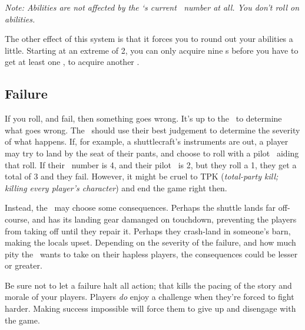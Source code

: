 \par\textit{Note: Abilities are not affected by the \pc `s current \both\, number at all. You don't roll on abilities.}

\par
The other effect of this system is that it forces you to round out your abilities a little. Starting at an extreme of 2, you can only acquire nine \lasersxp s before you have to get at least one \feelingsxp, to acquire another \lasersxp .

\subsection{Failure}
If you roll, and fail, then something goes wrong. It's up to the \gm\, to determine what goes wrong. The \gm\, should use their best judgement to determine the severity of what happens. If, for example, a shuttlecraft's instruments are out, a player may try to land by the seat of their pants, and choose to roll with a pilot \skill\, aiding that roll. If their \both\, number is 4, and their pilot \skill\, is 2, but they roll a 1, they get a total of 3 and they fail. However, it might be cruel to TPK (\textit{total-party kill; killing every player's character}) and end the game right then.

\par
Instead, the \gm\, may choose some consequences. Perhaps the shuttle lands far off-course, and has its landing gear damanged on touchdown, preventing the players from taking off until they repair it. Perhaps they crash-land in someone's barn, making the locals upset. Depending on the severity of the failure, and how much pity the \gm\, wants to take on their hapless players, the consequences could be lesser or greater.

\par
Be sure not to let a failure halt all action; that kills the pacing of the story and morale of your players. Players \textit{do} enjoy a challenge when they're forced to fight harder. Making success impossible will force them to give up and disengage with the game.